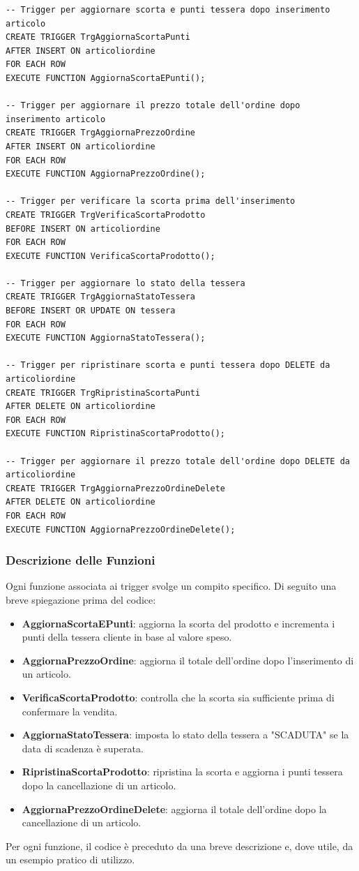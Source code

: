 \documentclass[a4paper,12pt]{article}
\begin{document}
\vspace{1.5em}
\begin{lstlisting}[style=sqlstyle]
-- Trigger per aggiornare scorta e punti tessera dopo inserimento articolo
CREATE TRIGGER TrgAggiornaScortaPunti
AFTER INSERT ON articoliordine
FOR EACH ROW
EXECUTE FUNCTION AggiornaScortaEPunti();

-- Trigger per aggiornare il prezzo totale dell'ordine dopo inserimento articolo
CREATE TRIGGER TrgAggiornaPrezzoOrdine
AFTER INSERT ON articoliordine
FOR EACH ROW
EXECUTE FUNCTION AggiornaPrezzoOrdine();

-- Trigger per verificare la scorta prima dell'inserimento
CREATE TRIGGER TrgVerificaScortaProdotto
BEFORE INSERT ON articoliordine
FOR EACH ROW
EXECUTE FUNCTION VerificaScortaProdotto();

-- Trigger per aggiornare lo stato della tessera
CREATE TRIGGER TrgAggiornaStatoTessera
BEFORE INSERT OR UPDATE ON tessera
FOR EACH ROW
EXECUTE FUNCTION AggiornaStatoTessera();

-- Trigger per ripristinare scorta e punti tessera dopo DELETE da articoliordine
CREATE TRIGGER TrgRipristinaScortaPunti
AFTER DELETE ON articoliordine
FOR EACH ROW
EXECUTE FUNCTION RipristinaScortaProdotto();

-- Trigger per aggiornare il prezzo totale dell'ordine dopo DELETE da articoliordine
CREATE TRIGGER TrgAggiornaPrezzoOrdineDelete
AFTER DELETE ON articoliordine
FOR EACH ROW
EXECUTE FUNCTION AggiornaPrezzoOrdineDelete();
\end{lstlisting}
\vspace{1.5em}

\subsubsection*{Descrizione delle Funzioni}
\noindent
Ogni funzione associata ai trigger svolge un compito specifico. Di seguito una breve spiegazione prima del codice:
\begin{itemize}
    \item \textbf{AggiornaScortaEPunti}: aggiorna la scorta del prodotto e incrementa i punti della tessera cliente in base al valore speso.
    \item \textbf{AggiornaPrezzoOrdine}: aggiorna il totale dell'ordine dopo l'inserimento di un articolo.
    \item \textbf{VerificaScortaProdotto}: controlla che la scorta sia sufficiente prima di confermare la vendita.
    \item \textbf{AggiornaStatoTessera}: imposta lo stato della tessera a "SCADUTA" se la data di scadenza è superata.
    \item \textbf{RipristinaScortaProdotto}: ripristina la scorta e aggiorna i punti tessera dopo la cancellazione di un articolo.
    \item \textbf{AggiornaPrezzoOrdineDelete}: aggiorna il totale dell'ordine dopo la cancellazione di un articolo.
\end{itemize}
\vspace{1em}
Per ogni funzione, il codice è preceduto da una breve descrizione e, dove utile, da un esempio pratico di utilizzo.
\end{document}
